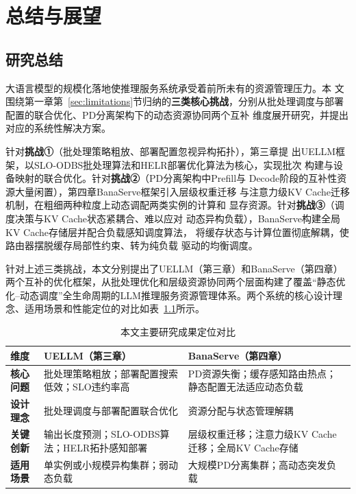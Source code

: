 
\chapter{总结与展望}

\section{研究总结}


大语言模型的规模化落地使推理服务系统承受着前所未有的资源管理压力。本
文围绕第一章第~\ref{sec:limitations}节归纳的\textbf{三类核心挑战}，分别从批处理调度与部署配置的联合优化、PD分离架构下的动态资源协同两个互补
维度展开研究，并提出对应的系统性解决方案。

针对\textbf{挑战①}（批处理策略粗放、部署配置忽视异构拓扑），第三章提
出UELLM框架，以SLO-ODBS批处理算法和HELR部署优化算法为核心，实现批次
构建与设备映射的联合优化。针对\textbf{挑战②}（PD分离架构中Prefill与
Decode阶段的互补性资源大量闲置），第四章BanaServe框架引入层级权重迁移
与注意力级KV Cache迁移机制，在粗细两种粒度上动态调配两类实例的计算和
显存资源。针对\textbf{挑战③}（调度决策与KV Cache状态紧耦合、难以应对
动态异构负载），BanaServe构建全局KV Cache存储层并配合负载感知调度算法，
将缓存状态与计算位置彻底解耦，使路由器摆脱缓存局部性约束、转为纯负载
驱动的均衡调度。


针对上述三类挑战，本文分别提出了UELLM（第三章）和BanaServe（第四章）两个互补的优化框架，从批处理优化和层级资源协同两个层面构建了覆盖“静态优化--动态调度”全生命周期的LLM推理服务资源管理体系。两个系统的核心设计理念、适用场景和性能定位的对比如表~\ref{tab:contribution_summary}所示。

\begin{table}[htbp]
    \centering
    \caption{本文主要研究成果定位对比}
    \label{tab:contribution_summary}
    \begin{tabularx}{\textwidth}{p{2.0cm}XX}
        \toprule
        \textbf{维度} &
        \textbf{UELLM（第三章）} &
        \textbf{BanaServe（第四章）} \\
        \midrule
        \textbf{核心问题} &
            批处理策略粗放；部署配置搜索低效；SLO违约率高 &
            PD资源失衡；缓存感知路由热点；静态配置无法适应动态负载 \\
        \textbf{设计理念} &
            批处理调度与部署配置联合优化 &
            资源分配与状态管理解耦 \\
        \textbf{关键创新} &
            输出长度预测；SLO-ODBS算法；HELR拓扑感知部署 &
            层级权重迁移；注意力级KV Cache迁移；全局KV Cache存储 \\
        \textbf{适用场景} &
            单实例或小规模异构集群；弱动态负载 &
            大规模PD分离集群；高动态突发负载 \\
        \bottomrule
    \end{tabularx}
\end{table}

